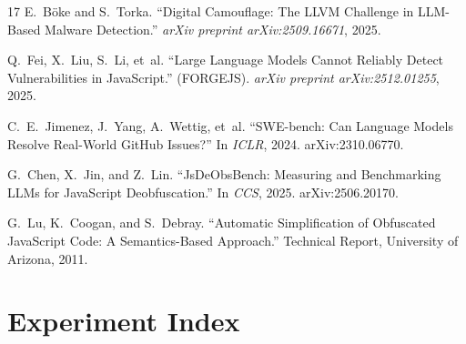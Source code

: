 \documentclass[11pt]{article}
\begin{document}
\begin{thebibliography}{17}
E.~B\"{o}ke and S.~Torka.
\newblock ``Digital Camouflage: The LLVM Challenge in LLM-Based Malware Detection.''
\newblock \emph{arXiv preprint arXiv:2509.16671}, 2025.

Q.~Fei, X.~Liu, S.~Li, et~al.
\newblock ``Large Language Models Cannot Reliably Detect Vulnerabilities in JavaScript.'' (FORGEJS).
\newblock \emph{arXiv preprint arXiv:2512.01255}, 2025.

C.~E.~Jimenez, J.~Yang, A.~Wettig, et~al.
\newblock ``SWE-bench: Can Language Models Resolve Real-World GitHub Issues?''
\newblock In \emph{ICLR}, 2024.
\newblock arXiv:2310.06770.

G.~Chen, X.~Jin, and Z.~Lin.
\newblock ``JsDeObsBench: Measuring and Benchmarking LLMs for JavaScript Deobfuscation.''
\newblock In \emph{CCS}, 2025.
\newblock arXiv:2506.20170.

G.~Lu, K.~Coogan, and S.~Debray.
\newblock ``Automatic Simplification of Obfuscated JavaScript Code: A Semantics-Based Approach.''
\newblock Technical Report, University of Arizona, 2011.

\end{thebibliography}

\appendix

\section{Experiment Index}
\end{document}
